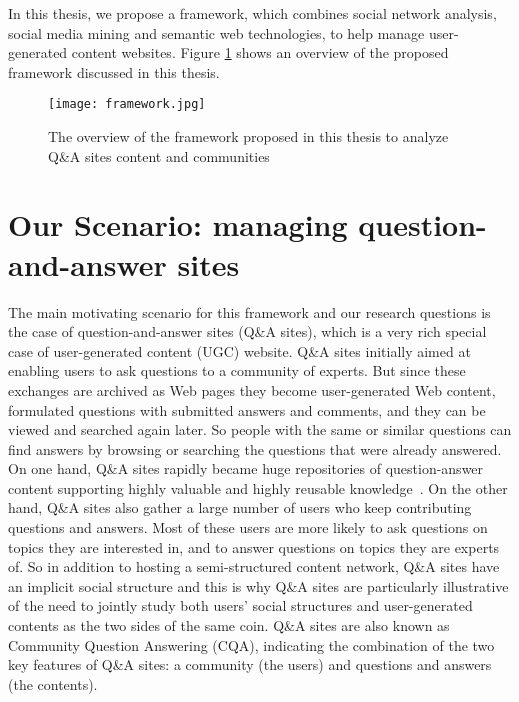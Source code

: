 In this thesis, we propose a framework, which combines social network analysis, social media mining and semantic web technologies, to help manage user-generated content websites. Figure \ref{fig:framework} shows an overview of the proposed framework discussed in this thesis.

\begin{figure}
\centering
\texttt{[image: framework.jpg]}  
\caption{The overview of the framework proposed in this thesis to analyze Q\&A sites content and communities}
\label{fig:framework} 
\end{figure}



\section{Our Scenario: managing question-and-answer sites}


The main motivating scenario for this framework and our research questions is the case of question-and-answer sites (Q\&A sites), which is a very rich special case of user-generated content (UGC) website. Q\&A sites initially aimed at enabling users to ask questions to a community of experts. But since these exchanges are archived as Web pages they become user-generated Web content, formulated questions with submitted answers and comments, and they can be viewed and searched again later. So people with the same or similar questions can find answers by browsing or searching the questions that were already answered. On one hand, Q\&A sites rapidly became huge repositories of question-answer content supporting highly valuable and highly reusable knowledge~\cite{anderson2012discovering}. On the other hand, Q\&A sites also gather a large number of users who keep contributing questions and answers. Most of these users are more likely to ask questions on topics they are interested in, and to answer questions on topics they are experts of. So in addition to hosting a semi-structured content network, Q\&A sites have an implicit social structure and this is why Q\&A sites are particularly illustrative of the need to jointly study both users' social structures and user-generated contents as the two sides of the same coin.
Q\&A sites are also known as Community Question Answering (CQA), indicating the combination of the two key features of Q\&A sites: a community (the users) and questions and answers (the contents).


